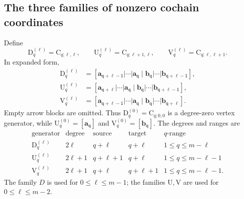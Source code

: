 \documentclass[a4paper,11pt,oneside,reqno]{amsart}
\theoremstyle{definition}
\numberwithin{equation}{section}
\begin{document}
	\subsection{The three families of nonzero cochain coordinates}
	
	Define
	\begin{equation}\label{eq:DUV-definitions}
		\mathrm{D}_q^{(\ell)}=\mathrm{C}_{q;\ell,\ell},\qquad
		\mathrm{U}_q^{(\ell)}=\mathrm{C}_{q;\ell+1,\ell},\qquad
		\mathrm{V}_q^{(\ell)}=\mathrm{C}_{q;\ell,\ell+1}.
	\end{equation}
	In expanded form,
	\begin{align}
		\mathrm{D}_q^{(\ell)}
		&=\mathsf{[\mathbf{a}_{q+\ell-1}|\cdots|\mathbf{a}_q\mid
			\mathbf{b}_q|\cdots|\mathbf{b}_{q+\ell-1}]},\label{eq:D-expanded}\\
		\mathrm{U}_q^{(\ell)}
		&=\mathsf{[\mathbf{a}_{q+\ell}|\cdots|\mathbf{a}_q\mid
			\mathbf{b}_q|\cdots|\mathbf{b}_{q+\ell-1}]},\label{eq:U-expanded}\\
		\mathrm{V}_q^{(\ell)}
		&=\mathsf{[\mathbf{a}_{q+\ell-1}|\cdots|\mathbf{a}_q\mid
			\mathbf{b}_q|\cdots|\mathbf{b}_{q+\ell}]}.\label{eq:V-expanded}
	\end{align}
	Empty arrow blocks are omitted.  Thus
	$\mathrm{D}_q^{(0)}=\mathrm{C}_{q;0,0}$ is a degree-zero vertex generator, while
	$\mathrm{U}_q^{(0)}=\mathsf{[\mathbf{a}_q]}$ and $\mathrm{V}_q^{(0)}=\mathsf{[\mathbf{b}_q]}$.  The degrees and ranges are
	\begin{equation}\label{eq:DUV-table}
		\begin{array}{c|c|c|c|c}
			\text{generator}&\text{degree}&\text{source}&\text{target}&q\text{-range}\\\hline
			\mathrm{D}_q^{(\ell)}&2\ell&q+\ell&q+\ell&1\leq q\leq m-\ell\\
			\mathrm{U}_q^{(\ell)}&2\ell+1&q+\ell+1&q+\ell&1\leq q\leq m-\ell-1\\
			\mathrm{V}_q^{(\ell)}&2\ell+1&q+\ell&q+\ell+1&1\leq q\leq m-\ell-1.
		\end{array}
	\end{equation}
	The family $D$ is used for $0\leq\ell\leq m-1$; the families $\mathrm{U},\mathrm{V}$
	are used for $0\leq\ell\leq m-2$.
	
\end{document}
